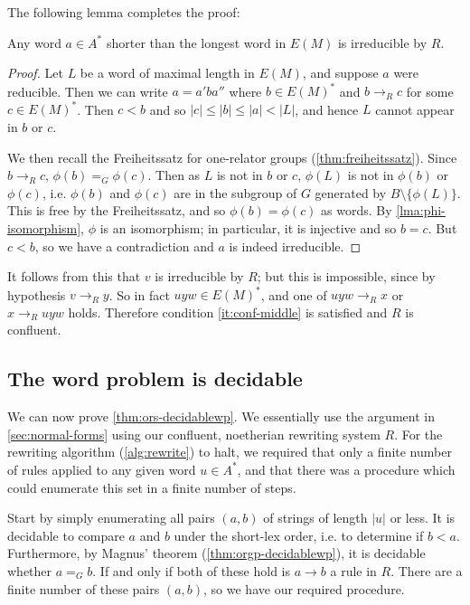 \documentclass[noindex,noinsetproof,12pt]{lmaths}
\begin{document}
The following lemma completes the proof:

\begin{lemma} \label{lma:shorter-irreducible}
	Any word $a \in A^*$ shorter than the longest word in $E(M)$ is irreducible by $R$.
\end{lemma}
\begin{proof}
	Let $L$ be a word of maximal length in $E(M)$, and suppose $a$ were reducible. Then we can write $a = a'ba''$ where $b \in E(M)^*$ and $b \to_R c$ for some $c \in E(M)^*$. Then $c < b$ and so $|c| \le |b| \le |a| < |L|$, and hence $L$ cannot appear in $b$ or $c$.
	
	We then recall the Freiheitssatz for one-relator groups (\cref{thm:freiheitssatz}).	Since $b \to_R c$, $\phi(b) =_G \phi(c)$. Then as $L$ is not in $b$ or $c$, $\phi(L)$ is not in $\phi(b)$ or $\phi(c)$, i.e. $\phi(b)$ and $\phi(c)$ are in the subgroup of $G$ generated by $B \setminus \{\phi(L)\}$. This is free by the Freiheitssatz, and so $\phi(b) = \phi(c)$ as words. By \cref{lma:phi-isomorphism}, $\phi$ is an isomorphism; in particular, it is injective and so $b = c$. But $c < b$, so we have a contradiction and $a$ is indeed irreducible.
\end{proof}

It follows from this that $v$ is irreducible by $R$; but this is impossible, since by hypothesis $v \to_R y$. So in fact $uyw \in E(M)^*$, and one of $uyw \to_R x$ or $x \to_R uyw$ holds. Therefore condition \ref{it:conf-middle} is satisfied and $R$ is confluent.


\subsection{The word problem is decidable}

We can now prove \cref{thm:ors-decidablewp}. We essentially use the argument in \cref{sec:normal-forms} using our confluent, noetherian rewriting system $R$. For the rewriting algorithm (\cref{alg:rewrite}) to halt, we required that only a finite number of rules applied to any given word $u \in A^*$, and that there was a procedure which could enumerate this set in a finite number of steps.

Start by simply enumerating all pairs $(a, b)$ of strings of length $|u|$ or less. It is decidable to compare $a$ and $b$ under the short-lex order, i.e. to determine if $b < a$. Furthermore, by Magnus' theorem (\cref{thm:orgp-decidablewp}), it is decidable whether $a =_G b$. If and only if both of these hold is $a \to b$ a rule in $R$. There are a finite number of these pairs $(a, b)$, so we have our required procedure.
\end{document}
